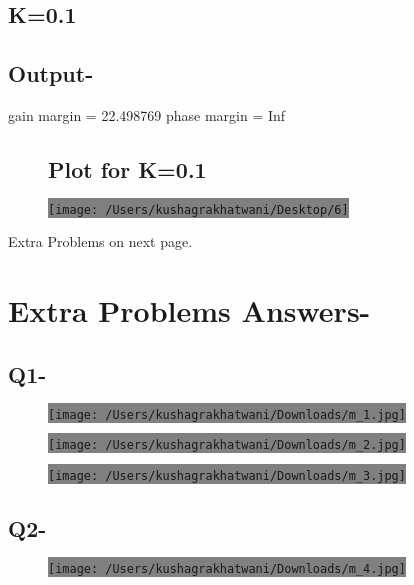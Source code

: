 \documentclass[12pt,A4paper]{article}
\begin{document}
			\subsection*{K=0.1}
		
			\subsection*{Output-}
gain margin = 22.498769
 phase margin = Inf 
		\begin{figure}[H]
	\subsection*{Plot for K=0.1}
		\centering
		\colorbox{gray}{\texttt{[image: /Users/kushagrakhatwani/Desktop/6]}}
	\end{figure}
	Extra Problems on next page.
	\section*{Extra Problems Answers-}
	\subsection*{Q1-}
	\begin{figure}[H]
		\centering
		\colorbox{gray}{\texttt{[image: /Users/kushagrakhatwani/Downloads/m\_1.jpg]}}
	\end{figure}
	\begin{figure}[H]
		\centering
		\colorbox{gray}{\texttt{[image: /Users/kushagrakhatwani/Downloads/m\_2.jpg]}}
	\end{figure}
	\begin{figure}[H]
		\centering
		\colorbox{gray}{\texttt{[image: /Users/kushagrakhatwani/Downloads/m\_3.jpg]}}
	\end{figure}
	\subsection*{Q2-}
	\begin{figure}[H]
		\centering
		\colorbox{gray}{\texttt{[image: /Users/kushagrakhatwani/Downloads/m\_4.jpg]}}
	\end{figure}
\end{document}
